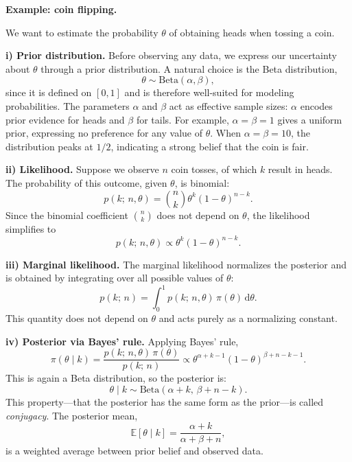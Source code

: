 \medskip

\textbf{Example: coin flipping.}

\medskip

We want to estimate the probability $\theta$ of obtaining heads when tossing a coin.

\medskip

\textbf{i) Prior distribution.} Before observing any data, we express our uncertainty about $\theta$ through a prior distribution. A natural choice is the Beta distribution,
\[
    \theta \sim \mathrm{Beta}(\alpha,\beta),
\]
since it is defined on $[0,1]$ and is therefore well-suited for modeling probabilities. The parameters $\alpha$ and $\beta$ act as effective sample sizes: $\alpha$ encodes prior evidence for heads and $\beta$ for tails. For example, $\alpha=\beta=1$ gives a uniform prior, expressing no preference for any value of $\theta$. When $\alpha=\beta=10$, the distribution peaks at $1/2$, indicating a strong belief that the coin is fair.

\medskip

\textbf{ii) Likelihood.} Suppose we observe $n$ coin tosses, of which $k$ result in heads. The probability of this outcome, given $\theta$, is binomial:
\[
    p(k;\, n,\theta) = \binom{n}{k}\theta^k (1-\theta)^{n-k}.
\]
Since the binomial coefficient $\binom{n}{k}$ does not depend on $\theta$, the likelihood simplifies to
\[
    p(k;\, n,\theta) \propto \theta^k (1-\theta)^{n-k}.
\]

\medskip

\textbf{iii) Marginal likelihood.} The marginal likelihood normalizes the posterior and is obtained by integrating over all possible values of $\theta$:
\[
    p(k;\, n) = \int_0^1 p(k;\,n,\theta)\,\pi(\theta)\,\mathrm{d}\theta.
\]
This quantity does not depend on $\theta$ and acts purely as a normalizing constant.

\medskip

\textbf{iv) Posterior via Bayes' rule.} Applying Bayes' rule,
\[
    \pi(\theta \mid k) = \frac{p(k;\,n,\theta)\,\pi(\theta)}{p(k;\,n)} \propto \theta^{\alpha+k-1}(1-\theta)^{\beta+n-k-1}.
\]
This is again a Beta distribution, so the posterior is:
\[
    \theta \mid k \sim \mathrm{Beta}(\alpha+k,\,\beta+n-k).
\]
This property---that the posterior has the same form as the prior---is called \emph{conjugacy}. The posterior mean,
\[
    \mathbb{E}[\theta \mid k] = \frac{\alpha + k}{\alpha + \beta + n},
\]
is a weighted average between prior belief and observed data.

\medskip

